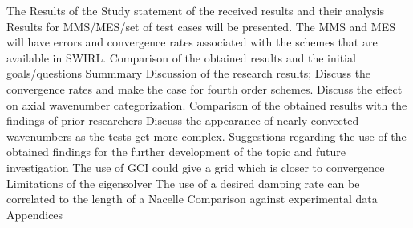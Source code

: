 \documentclass[a4paper]{report}
\begin{document}
\begin{outline}[enumerate]
    The 
    \1 Results of the Study
    \2 statement of the received results and their analysis
    \3 Results for MMS/MES/set of test cases will be presented. The MMS and MES
    will have errors and convergence rates associated with the schemes that are
    available in SWIRL.
    \2 Comparison of the obtained results and the initial goals/questions
    \1 Summmary
    \2 Discussion of the research results;
    \3 Discuss the convergence rates and make the case for fourth order schemes.
    \3 Discuss the effect on axial wavenumber categorization. 
    \2 Comparison of the obtained results with the findings of prior researchers
    \3 Discuss the appearance of nearly convected wavenumbers as the tests get more complex.
    \2 Suggestions regarding the use of the obtained findings for the further
    development of the topic and future investigation 
    \3 The use of GCI could give a grid which is closer to convergence
    \3 Limitations of the eigensolver
    \3 The use of a desired damping rate can be correlated to the length of a 
    Nacelle
    \3 Comparison against experimental data
    \1 Appendices
\end{outline}
\end{document}
